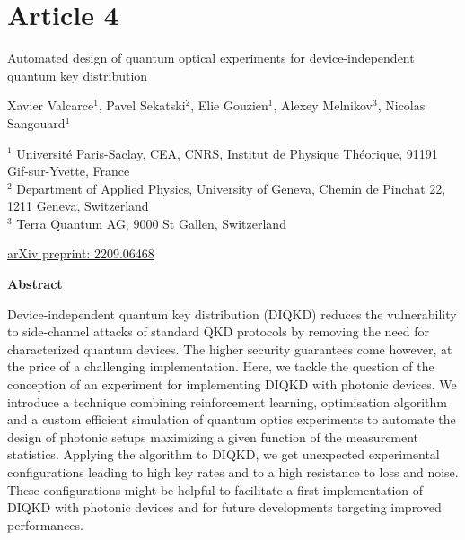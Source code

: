 \chapter*{Article 4}

\begin{center}
\textrm{\LARGE Automated design of quantum optical experiments for device-independent quantum key distribution}

\vspace{2cm}

\normalsize
Xavier Valcarce$^{1}$, Pavel Sekatski$^{2}$, Elie Gouzien$^{1}$, Alexey Melnikov$^{3}$, Nicolas Sangouard$^{1}$
\bigbreak

{\footnotesize
	$^1$ Université Paris-Saclay, CEA, CNRS, Institut de Physique Théorique, 91191 Gif-sur-Yvette, France \\
	$^2$ Department of Applied Physics, University of Geneva, Chemin de Pinchat 22, 1211 Geneva, Switzerland \\
	$^3$ Terra Quantum AG, 9000 St Gallen, Switzerland
}

\raggedright
\bigbreak
\faLink \quad \href{https://arxiv.org/abs/2209.06468}{arXiv preprint: 2209.06468}
\vspace{1cm}

\centering
\textbf{Abstract}
\bigbreak

Device-independent quantum key distribution (DIQKD) reduces the vulnerability to side-channel attacks of standard QKD protocols by removing the need for characterized quantum devices.
The higher security guarantees come however, at the price of a challenging implementation.
Here, we tackle the question of the conception of an experiment for implementing DIQKD with photonic devices.
We introduce a technique combining reinforcement learning, optimisation algorithm and a custom efficient simulation of quantum optics experiments to automate the design of photonic setups maximizing a given function of the measurement statistics.
Applying the algorithm to DIQKD, we get unexpected experimental configurations leading to high key rates and to a high resistance to loss and noise.
These configurations might be helpful to facilitate a first implementation of DIQKD with photonic devices and for future developments targeting improved performances.

\end{center}
